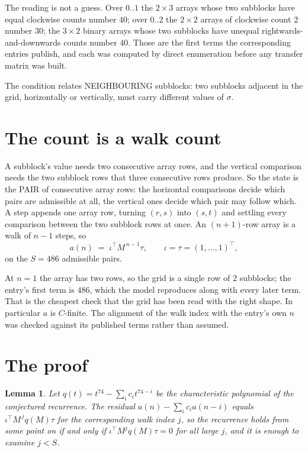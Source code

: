 \documentclass[11pt,a4paper]{article}
\theoremstyle{plain}
\newtheorem{lemma}[theorem]{Lemma}
\theoremstyle{definition}
\begin{document}
The reading is not a guess. Over $0..1$ the $2\times3$ arrays whose two subblocks have equal
clockwise counts number $40$; over $0..2$ the $2\times2$ arrays of clockwise count $2$ number
$30$; the $3\times2$ binary arrays whose two subblocks have unequal rightwards-and-downwards
counts number $40$. Those are the first terms the corresponding entries publish, and each was
computed by direct enumeration before any transfer matrix was built.

The condition relates NEIGHBOURING subblocks: two subblocks adjacent in the grid, horizontally
or vertically, must carry different values of $\sigma$.

\section{The count is a walk count}

A subblock's value needs two consecutive array rows, and the vertical
comparison needs the two subblock rows that three consecutive rows produce. So the state is the
PAIR of consecutive array rows: the horizontal comparisons decide which pairs are admissible at
all, the vertical ones decide which pair may follow which. A step appends one array row,
turning $(r,s)$ into $(s,t)$ and settling every comparison between the two subblock rows at
once. An $(n+1)$-row array is a walk of $n-1$ steps, so
\[
a(n)\;=\;\iota^{\!\top}M^{\,n-1}\tau,\qquad\iota=\tau=(1,\dots,1)^{\!\top},
\]
on the $S=486$ admissible pairs.

At $n=1$ the array has two rows, so the grid is a single row of $2$
subblocks; the entry's first term is $486$, which the model
reproduces along with every later term. That is the cheapest check that the grid has been read
with the right shape.
In particular $a$ is $C$-finite. The alignment of the walk index with the entry's own $n$ was
checked against its published terms rather than assumed.

\section{The proof}

\begin{lemma}\label{lem:crit}
Let $q(t)=t^{74}-\sum_i c_it^{74-i}$ be the characteristic polynomial of the
conjectured recurrence. The residual $a(n)-\sum_ic_ia(n-i)$ equals
$\iota^{\!\top}M^{\,j}q(M)\tau$ for the corresponding walk index $j$, so the recurrence
holds from some point on if and only if $\iota^{\!\top}M^{j}q(M)\tau=0$ for all large $j$,
and it is enough to examine $j<S$.
\end{lemma}
\end{document}

